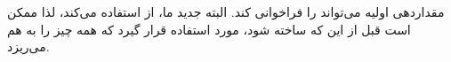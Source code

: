 \section{}
\paragraph{}\label{answer:110}
مقداردهی اولیه  می‌تواند  را فراخوانی کند. البته  جدید ما، از  استفاده می‌کند، لذا  ممکن است قبل از این که ساخته شود، مورد استفاده قرار گیرد که همه چیز را به هم می‌ریزد.